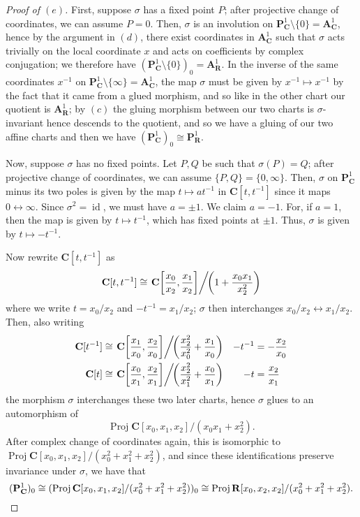 \documentclass[10pt]{article}
\theoremstyle{definition}
\theoremstyle{remark}
\numberwithin{equation}{section}
\numberwithin{figure}{subsubsection}
\DeclareMathOperator{\Proj}{Proj}
\DeclareMathOperator{\id}{id}
\begin{document}
\begin{proof}[Proof of $(e)$]
  First, suppose $\sigma$ has a fixed point $P$; after projective change of
  coordinates, we can assume $P = 0$. Then, $\sigma$ is an involution
  on $\mathbf{P}^1_\mathbf{C} \setminus \{0\} = \mathbf{A}^1_\mathbf{C}$, hence by
  the argument in $(d)$, there exist coordinates in $\mathbf{A}^1_\mathbf{C}$
  such that $\sigma$ acts trivially on the local coordinate $x$ and acts on
  coefficients by complex conjugation; we therefore have
  $(\mathbf{P}^1_\mathbf{C} \setminus \{0\})_0 = \mathbf{A}^1_\mathbf{R}$. In the
  inverse of the same coordinates
  $x^{-1}$ on $\mathbf{P}^1_\mathbf{C} \setminus \{\infty\} =
  \mathbf{A}^1_\mathbf{C}$, the map $\sigma$ must be given by $x^{-1} \mapsto
  x^{-1}$ by the fact that it came from a glued morphism, and so like in the
  other chart our quotient is $\mathbf{A}^1_\mathbf{R}$; by $(c)$ the gluing
  morphism between our two charts is $\sigma$-invariant hence
  descends to the quotient, and so we have a gluing of our two affine charts and
  then we have $(\mathbf{P}^1_\mathbf{C})_0 \cong \mathbf{P}^1_\mathbf{R}$.
  \par Now, suppose $\sigma$ has no fixed points. Let $P,Q$ be such that
  $\sigma(P) = Q$; after projective change of coordinates, we can assume
  $\{P,Q\} = \{0,\infty\}$. Then, $\sigma$ on $\mathbf{P}^1_\mathbf{C}$ minus
  its two poles is given by the map $t \mapsto at^{-1}$ in
  $\mathbf{C}[t,t^{-1}]$ since it maps $0 \leftrightarrow \infty$.
  Since $\sigma^2 = \id$, we must have $a = \pm1$. We claim $a = -1$. For, if $a
  = 1$, then the map is given by $t \mapsto t^{-1}$, which has fixed points at
  $\pm1$. Thus, $\sigma$ is given by $t \mapsto -t^{-1}$.
  \par Now rewrite $\mathbf{C}[t,t^{-1}]$ as
  \begin{equation*}
    \mathbf{C}[t,t^{-1}] \cong \left.\mathbf{C}\!\left[ \frac{x_0}{x_2},
    \frac{x_1}{x_2} \right]\right/ \!\!\left( 1 + \frac{x_0x_1}{x_2^2} \right)
  \end{equation*}
  where we write $t = x_0/x_2$ and $-t^{-1} = x_1/x_2$; $\sigma$ then
  interchanges $x_0/x_2 \leftrightarrow x_1/x_2$. Then, also writing
  \begin{align*}
    \mathbf{C}[t^{-1}] \cong \left.\mathbf{C}\!\left[ \frac{x_1}{x_0},
    \frac{x_2}{x_0} \right]\right/ \!\!\left( \frac{x_2^2}{x_0^2} +
    \frac{x_1}{x_0} \right) & & -t^{-1} &= -\frac{x_2}{x_0}\\
    \mathbf{C}[t] \cong \left.\mathbf{C}\!\left[ \frac{x_0}{x_1}, \frac{x_2}{x_1}
    \right]\right/\!\!\left( \frac{x_2^2}{x_1^2} + \frac{x_0}{x_1} \right) &
    & -t &= \frac{x_2}{x_1}
  \end{align*}
  the morphism $\sigma$ interchanges these two later charts, hence $\sigma$
  glues to an automorphism of \[\Proj \mathbf{C}[x_0,x_1,x_2]/(x_0x_1+x_2^2).\]
  After complex change of coordinates again, this is isomorphic to
  $\Proj \mathbf{C}[x_0,x_1,x_2]/(x_0^2+x_1^2+x_2^2)$, and since these
  identifications preserve invariance under $\sigma$, we have that
  \[(\mathbf{P}^1_\mathbf{C})_0 \cong (\Proj
  \mathbf{C}[x_0,x_1,x_2]/(x_0^2+x_1^2+x_2^2) )_0 \cong \Proj
  \mathbf{R}[x_0,x_2,x_2]/(x_0^2+x_1^2+x_2^2).\qedhere\]
\end{proof}
\end{document}

